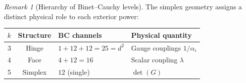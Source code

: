 \documentclass[12pt]{article}
\theoremstyle{remark}
\newtheorem{remark}[theorem]{Remark}
\theoremstyle{definition}
\begin{document}
\begin{remark}[Hierarchy of Binet--Cauchy levels]
The simplex geometry assigns a distinct physical role to each exterior power:
\begin{center}
\begin{tabular}{ccll}
\hline
$k$ & Structure & BC channels & Physical quantity \\
\hline
3 & Hinge & $1+12+12=25=d^2$ & Gauge couplings $1/\alpha_i$ \\
4 & Face  & $4+12=16$         & Scalar coupling $\lambda$ \\
5 & Simplex & $12$ (single)   & $\det(G)$ \\
\hline
\end{tabular}
\end{center}
\end{remark}
\end{document}
